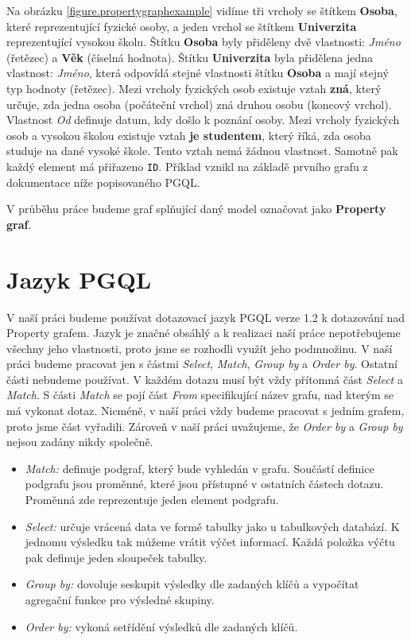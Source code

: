 Na obrázku \ref{figure.propertygraphexample} vidíme tři vrcholy se štítkem \textbf{Osoba}, které reprezentující fyzické osoby, a jeden vrchol se štítkem \textbf{Univerzita} reprezentující vysokou školu.
Štítku \textbf{Osoba} byly přiděleny dvě vlastnosti: \textit{Jméno} (řetězec) a \textbf{Věk} (číselná hodnota).
Štítku \textbf{Univerzita} byla přidělena jedna vlastnost: \textit{Jméno}, která odpovídá stejné vlastnosti štítku \textbf{Osoba} a mají stejný typ hodnoty (řetězec).
Mezi vrcholy fyzických osob existuje vztah \textbf{zná}, který určuje, zda jedna osoba (počáteční vrchol) zná druhou osobu (koncový vrchol).
Vlastnost \textit{Od} definuje datum, kdy došlo k poznání osoby.
Mezi vrcholy fyzických osob a vysokou školou existuje vztah \textbf{je studentem}, který říká, zda osoba studuje na dané vysoké škole.
Tento vztah nemá žádnou vlastnost.
Samotně pak každý element má přiřazeno \texttt{ID}.
Příklad vznikl na základě prvního grafu z dokumentace níže popisovaného PGQL.

V průběhu práce budeme graf splňující daný model označovat jako \textbf{Property graf}.

\section{Jazyk PGQL}
\label{req.pgql}

V naší práci budeme používat dotazovací jazyk PGQL \citep{pgql} verze 1.2 k dotazování nad Property grafem.
Jazyk je značné obsáhlý a k realizaci naší práce nepotřebujeme všechny jeho vlastnosti, proto jsme se rozhodli využít jeho podmnožinu.
V naší práci budeme pracovat jen s částmi \textit{Select}, \textit{Match}, \textit{Group by} a \textit{Order by}.
Ostatní části nebudeme používat.
V každém dotazu musí být vždy přítomná část \textit{Select} a \textit{Match}.
S části \textit{Match} se pojí část \textit{From} specifikující název grafu, nad kterým se má vykonat dotaz.
Nicméně, v naší práci vždy budeme pracovat s jedním grafem, proto jsme část vyřadili. 
Zároveň v naší práci uvažujeme, že \textit{Order by} a \textit{Group by} nejsou zadány nikdy společně.

\begin{itemize}
\item \textit{Match:} definuje podgraf, který bude vyhledán v grafu.
Součástí definice podgrafu jsou proměnné, které jsou přístupné v ostatních částech dotazu.
Proměnná zde reprezentuje jeden element podgrafu.

\item \textit{Select:} určuje vrácená data ve formě tabulky jako u tabulkových databází.
K jednomu výsledku tak můžeme vrátit výčet informací.
Každá položka výčtu pak definuje jeden sloupeček tabulky.

\item \textit{Group by:} dovoluje seskupit výsledky dle zadaných klíčů a vypočítat agregační funkce pro výsledné skupiny.

\item \textit{Order by:} vykoná setřídění výsledků dle zadaných klíčů.
\end{itemize}

